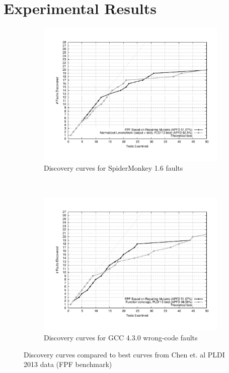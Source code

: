 \section{Experimental Results}

\begin{figure}[t!]
    \centering
    \begin{subfigure}[t]{0.5\textwidth}
        \centering
        \includegraphics[width=1.0\textwidth]{jscurve}
        \caption{Discovery curves for SpiderMonkey 1.6 faults}
        \label{jscurves}
    \end{subfigure}%
    ~ 
    \begin{subfigure}[t]{0.5\textwidth}
        \centering
        \includegraphics[width=1.0\textwidth]{gcccurve}
        \caption{Discovery curves for GCC 4.3.0 wrong-code faults}
        \label{gcccurves}
    \end{subfigure}
    \caption{Discovery curves compared to best curves from Chen et. al PLDI 2013 data (FPF benchmark)}
\end{figure}


